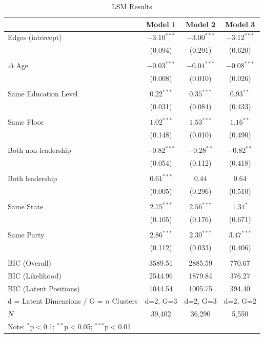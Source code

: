 \documentclass[fleqn,12pt]{wlscirep}
\begin{document}
\begin{table} 
\begin{center}
\begin{tabular}{l c c c }
\hline
 & Model 1 & Model 2 & Model 3 \\
\hline
Edges (intercept)                      & $-3.10^{***}$       & $-3.00^{***}$       & $-3.12^{***}$       \\
  & (0.094) & (0.291) & (0.620) \\ 
  & & & \\ 
$\Delta$ Age                & $-0.03^{***}$       & $-0.04^{***}$       & $-0.08^{***}$       \\
  & (0.008) & (0.010) & (0.026) \\ 
  & & & \\ 
Same Education Level        & $0.22^{***}$        & $0.35^{***}$        & $0.93^{**}$        \\
  & (0.031) & (0.084) & (0.433) \\ 
  & & & \\ 
Same Floor            & $1.02^{***}$        & $1.53^{***}$        & $1.16^{**}$        \\
  & (0.148) & (0.010) & (0.490) \\ 
  & & & \\ 
Both non-leadership  & $-0.82^{***}$       & $-0.28^{**}$       & $-0.82^{**}$       \\
  & (0.054) & (0.112) & (0.418) \\ 
  & & & \\ 
Both leadership  & $0.61^{***}$        & $0.44$            & $0.64$            \\
  & (0.005) & (0.296) & (0.510) \\ 
  & & & \\ 
Same State               & $2.75^{***}$        & $2.56^{***}$        & $1.31^{*}$        \\
  & (0.105) & (0.176) & (0.671) \\ 
  & & & \\ 
Same Party            & $2.86^{***}$        & $2.30^{***}$        & $3.47^{***}$        \\
  & (0.112) & (0.033) & (0.406) \\ 
  & & & \\ 
\hline
BIC (Overall)              & 3589.51           & 2885.59           & 770.67            \\
BIC (Likelihood)           & 2544.96           & 1879.84           & 376.27            \\
BIC (Latent Positions)     & 1044.54           & 1005.75           & 394.40            \\
d = Latent Dimensions / G = $n$ Clusters & d=2, G=3 & d=2, G=3 & d=2, G=2\\
$N$ & 39,402 & 36,290 & 5,550 \\  
\hline
\multicolumn{4}{l}{\scriptsize{Note: {$^{*}$p$<$0.1; $^{**}$p$<$0.05; $^{***}$p$<$0.01}}}
\end{tabular}
\caption{LSM Results}
\label{table:LSM_coefficients}
\end{center}
\end{table}
\end{document}
